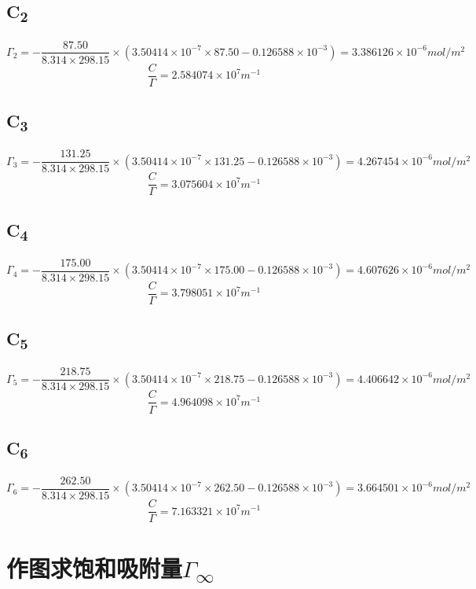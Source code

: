 \documentclass[11pt]{report}
\begin{document}
\section{C\textsubscript{2}}
\label{sec:org4ff173c}
\[
    \Gamma_{2}=-\frac{87.50}{8.314\times 298.15}\times (3.50414\times 10^{-7}\times 87.50-0.126588\times 10^{-3})=3.386126\times 10^{-6} mol/m^{2}
    \]
\[
    \frac{C}{\Gamma}=2.584074\times 10^{7}m^{-1}
    \]

\section{C\textsubscript{3}}
\label{sec:org414ab70}
\[
    \Gamma_{3}=-\frac{131.25}{8.314\times 298.15}\times (3.50414\times 10^{-7}\times 131.25-0.126588\times 10^{-3})=4.267454\times 10^{-6} mol/m^{2}
    \]
\[
    \frac{C}{\Gamma}=3.075604\times 10^{7}m^{-1}
    \]
\section{C\textsubscript{4}}
\label{sec:orgb600c8a}
\[
    \Gamma_{4}=-\frac{175.00}{8.314\times 298.15}\times (3.50414\times 10^{-7}\times 175.00-0.126588\times 10^{-3})=4.607626\times 10^{-6} mol/m^{2}
    \]
\[
    \frac{C}{\Gamma}=3.798051\times 10^{7}m^{-1}
    \]

\section{C\textsubscript{5}}
\label{sec:org2ab4d01}
\[
    \Gamma_{5}=-\frac{218.75}{8.314\times 298.15}\times (3.50414\times 10^{-7}\times 218.75-0.126588\times 10^{-3})=4.406642\times 10^{-6} mol/m^{2}
    \]
\[
    \frac{C}{\Gamma}=4.964098\times 10^{7}m^{-1}
    \]


\section{C\textsubscript{6}}
\label{sec:orgafdef19}
\[
    \Gamma_{6}=-\frac{262.50}{8.314\times 298.15}\times (3.50414\times 10^{-7}\times 262.50-0.126588\times 10^{-3})=3.664501\times 10^{-6} mol/m^{2}
    \]
\[
    \frac{C}{\Gamma}=7.163321\times 10^{7}m^{-1}
    \]

\chapter{作图求饱和吸附量\(\Gamma\)\textsubscript{\(\infty\)}}
\label{sec:orgb5af31f}
\end{document}

